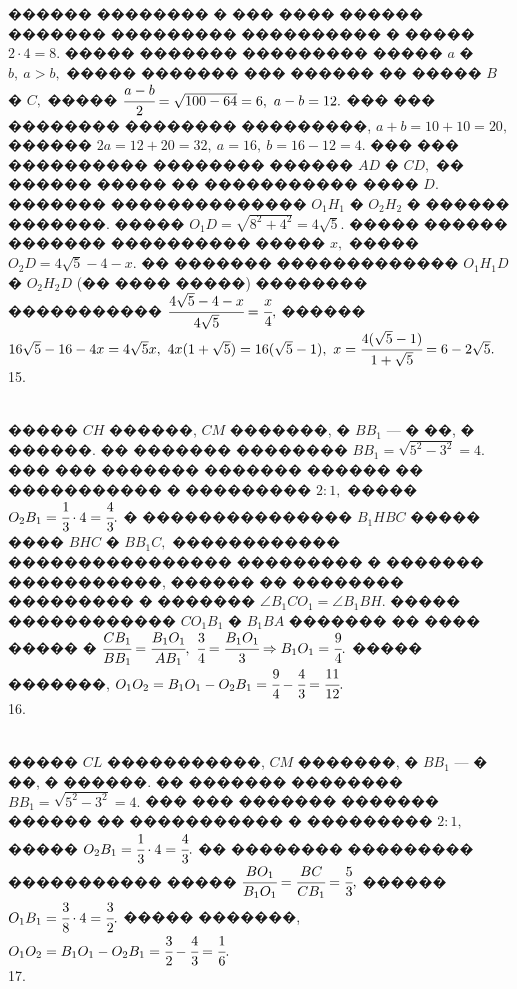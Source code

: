 \documentclass[12pt]{article}
\begin{document}
������ �������� � ��� ���� ������ ������� ��������� ���������� � ����� $2\cdot4=8.$ ����� ������� ��������� ����� $a$ � $b,\ a>b,$ ����� ������� ��� ������ �� ����� $B$ � $C,$ ����� $\cfrac{a-b}{2}=\sqrt{100-64}=6,\ a-b=12.$ ��� ��� �������� �������� ���������, $a+b=10+10=20,$ ������ $2a=12+20=32,\ a=16,\ b=16-12=4.$ ��� ��� ���������� �������� ������ $AD$ � $CD,$ �� ������ ����� �� ����������� ���� $D.$ ������� �������������� $O_1H_1$ � $O_2H_2$ � ������ �������. ����� $O_1D=\sqrt{8^2+4^2}=4\sqrt{5}.$ ����� ������ ������� ���������� ����� $x,$ �����  $O_2D=4\sqrt{5}-4-x.$ �� ������� ������������� $O_1H_1D$ � $O_2H_2D$ (�� ���� �����) �������� ����������� $\cfrac{4\sqrt{5}-4-x }{4\sqrt{5}}=\cfrac{x}{4},$ ������ $16\sqrt{5}-16-4x=4\sqrt{5}x,\ 4x(1+\sqrt{5})=16(\sqrt{5}-1),\ x=\cfrac{4(\sqrt{5}-1)}{1+\sqrt{5}}=6-2\sqrt{5}.$\\
15. \begin{figure}[ht!]
\end{figure}\\
����� $CH$ ������, $CM$ �������, � $BB_1$ --- � ��, � ������. �� ������� �������� $BB_1=\sqrt{5^2-3^2}=4.$ ��� ��� ������� ������� ������ �� ����������� � ��������� $2:1,$ ����� $O_2B_1=\cfrac{1}{3}\cdot4=\cfrac{4}{3}.$ � ��������������� $B_1HBC$ ����� ���� $BHC$ � $BB_1C,$ ������������ ���������������� ��������� � ������� �����������, ������ �� �������� ��������� � ������� $\angle B_1CO_1=\angle B_1BH.$ ����� ������������ $CO_1B_1$ � $B_1BA$ ������� �� ���� ����� �  $\cfrac{CB_1}{BB_1}=\cfrac{B_1O_1}{AB_1},\ \cfrac{3}{4}=\cfrac{B_1O_1}{3}\Rightarrow B_1O_1=\cfrac{9}{4}.$ ����� �������, $O_1O_2=B_1O_1-O_2B_1=\cfrac{9}{4}-\cfrac{4}{3}=\cfrac{11}{12}.$\\
16. \begin{figure}[ht!]
\end{figure}\\
����� $CL$ �����������, $CM$ �������, � $BB_1$ --- � ��, � ������. �� ������� �������� $BB_1=\sqrt{5^2-3^2}=4.$ ��� ��� ������� ������� ������ �� ����������� � ��������� $2:1,$ ����� $O_2B_1=\cfrac{1}{3}\cdot4=\cfrac{4}{3}.$ �� �������� ��������� ����������� ����� $\cfrac{BO_1}{B_1O_1}=\cfrac{BC}{CB_1}=\cfrac{5}{3},$ ������ $O_1B_1=\cfrac{3}{8}\cdot4=\cfrac{3}{2}.$ ����� �������, $O_1O_2=B_1O_1-O_2B_1=\cfrac{3}{2}-\cfrac{4}{3}=\cfrac{1}{6}.$\\
17. \begin{figure}[ht!]
\end{figure}\\
\end{document}
